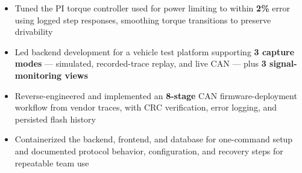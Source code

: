 \documentclass[10pt,letterpaper]{article}
\renewcommand{\entryspace}{\vspace{0pt}}
\begin{document}
\entryspace

\orgline{\spartanracing}
\begin{itemize}
  \item Tuned the PI torque controller used for power limiting to within \textbf{2\%} error using logged step responses, smoothing torque transitions to preserve drivability
\end{itemize}


\begin{itemize}
  \item Led backend development for a vehicle test platform supporting \textbf{3 capture modes} --- simulated, recorded-trace replay, and live CAN --- plus \textbf{3 signal-monitoring views}
  \item Reverse-engineered and implemented an \textbf{8-stage} CAN firmware-deployment workflow from vendor traces, with CRC verification, error logging, and persisted flash history
  \item Containerized the backend, frontend, and database for one-command setup and documented protocol behavior, configuration, and recovery steps for repeatable team use
\end{itemize}
\end{document}

